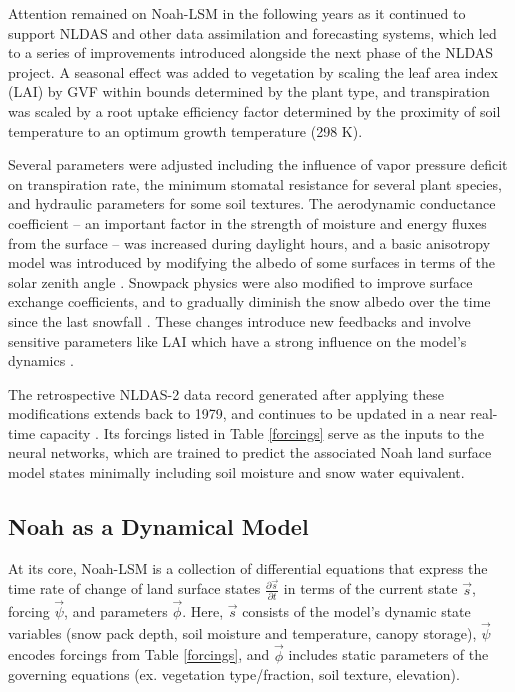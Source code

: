 \documentclass[11pt]{article}
\begin{document}
\begin{multicols}{2}

    Attention remained on Noah-LSM in the following years as it continued to support NLDAS and other data assimilation and forecasting systems, which led to a series of improvements introduced alongside the next phase of the NLDAS project. A seasonal effect was added to vegetation by scaling the leaf area index (LAI) by GVF within bounds determined by the plant type, and transpiration was scaled by a root uptake efficiency factor determined by the proximity of soil temperature to an optimum growth temperature (298 K).

    Several parameters were adjusted including the influence of vapor pressure deficit on transpiration rate, the minimum stomatal resistance for several plant species, and hydraulic parameters for some soil textures. The aerodynamic conductance coefficient -- an important factor in the strength of moisture and energy fluxes from the surface -- was increased during daylight hours, and a basic anisotropy model was introduced by modifying the albedo of some surfaces in terms of the solar zenith angle \cite{wei_improvement_2011}. Snowpack physics were also modified to improve surface exchange coefficients, and to gradually diminish the snow albedo over the time since the last snowfall \cite{livneh_noah_2010}\cite{liang_simple_1994}. These changes introduce new feedbacks and involve sensitive parameters like LAI which have a strong influence on the model's dynamics \cite{rosero_quantifying_2010}.

    The retrospective NLDAS-2 data record generated after applying these modifications extends back to 1979, and continues to be updated in a near real-time capacity \cite{xia_continental-scale_2012}. Its forcings listed in Table \ref{forcings} serve as the inputs to the neural networks, which are trained to predict the associated Noah land surface model states minimally including soil moisture and snow water equivalent.


    \subsection{Noah as a Dynamical Model}

    At its core, Noah-LSM is a collection of differential equations that express the time rate of change of land surface states $\frac{\partial \vec{s}}{\partial t}$ in terms of the current state $\vec{s}$, forcing $\vec{\psi}$, and parameters $\vec{\phi}$. Here, $\vec{s}$ consists of the model's dynamic state variables (snow pack depth, soil moisture and temperature, canopy storage), $\vec{\psi}$ encodes forcings from Table \ref{forcings}, and $\vec{\phi}$ includes static parameters of the governing equations (ex. vegetation type/fraction, soil texture, elevation).


\end{multicols}
\end{document}
